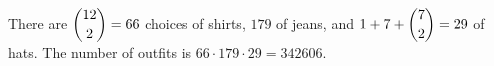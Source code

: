 There are $\dbinom{12}2=66$ choices of shirts, $179$ of jeans, and $1+7+\dbinom72=29$ of hats. The number of outfits is $66\cdot179\cdot29=\boxed{342606}$.
